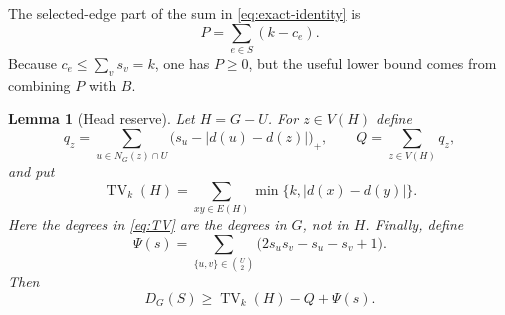 \documentclass[a4paper,11pt]{amsart}
\numberwithin{equation}{section}
\newtheorem{lemma}[theorem]{Lemma}
\theoremstyle{definition}
\theoremstyle{remark}
\newcommand{\TV}{\operatorname{TV}}
\begin{document}
The selected-edge part of the sum in \eqref{eq:exact-identity} is
\begin{equation}
P=\sum_{e\in S}(k-c_e).
\label{eq:def-P}
\end{equation}
Because $c_e\le\sum_vs_v=k$, one has $P\ge0$, but the useful lower bound comes from combining $P$ with $B$.

\begin{lemma}[Head reserve]\label{lem:reserve}
Let $H=G-U$.  For $z\in V(H)$ define
\begin{equation}
q_z=\sum_{u\in N_G(z)\cap U}\bigl(s_u-\lvert d(u)-d(z)\rvert\bigr)_+,
\qquad
Q=\sum_{z\in V(H)}q_z,
\label{eq:q-Q}
\end{equation}
and put
\begin{equation}
\TV_k(H)=\sum_{xy\in E(H)}\min\{k,\lvert d(x)-d(y)\rvert\}.
\label{eq:TV}
\end{equation}
Here the degrees in \eqref{eq:TV} are the degrees in $G$, not in $H$.  Finally, define
\begin{equation}
\Psi(s)=\sum_{\{u,v\}\in\binom U2}
       \bigl(2s_us_v-s_u-s_v+1\bigr).
\label{eq:Psi}
\end{equation}
Then
\begin{equation}
D_G(S)\ge \TV_k(H)-Q+\Psi(s).
\label{eq:reserve-inequality}
\end{equation}
\end{lemma}
\end{document}
